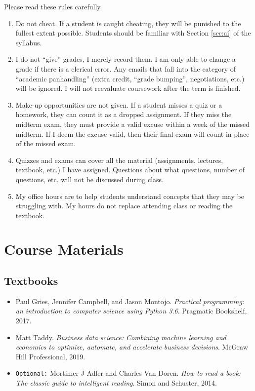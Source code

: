 \documentclass[11pt]{paper}
\begin{document}
Please read these rules carefully.

\begin{enumerate}

\item Do not cheat. If a student is caught cheating, they will be punished to the fullest extent possible. Students should be familiar with Section \ref{sec:ai} of the syllabus.

\item I do not ``give'' grades, I merely record them. I am only able to change a grade if there is a clerical error. Any emails that fall into the category of ``academic panhandling'' (extra credit, ``grade bumping'', negotiations, etc.) will be ignored. I will not reevaluate coursework after the term is finished.

\item Make-up opportunities are not given. If a student misses a quiz or a homework, they can count it as a dropped assignment. If they miss the midterm exam, they must provide a valid excuse within a week of the missed midterm. If I deem the excuse valid, then their final exam will count in-place of the missed exam. 

\item Quizzes and exams can cover all the material (assignments, lectures, textbook, etc.) I have assigned. Questions about what questions, number of questions, etc. will not be discussed during class.

\item My office hours are to help students understand concepts that they may be struggling with. My hours do not replace attending class or reading the textbook.



\end{enumerate}


\section{Course Materials}
 
\subsection{Textbooks}

\begin{itemize}
\item Paul Gries, Jennifer Campbell, and Jason Montojo. \textit{Practical programming: an introduction to computer science using Python 3.6}. Pragmatic Bookshelf, 2017.

\item Matt Taddy. \textit{Business data science: Combining machine learning and economics to optimize, automate, and accelerate business decisions}. McGraw Hill Professional, 2019.

\item \texttt{Optional:}  Mortimer J Adler and Charles Van Doren. \textit{How to read a book: The classic guide to intelligent reading}. Simon and Schuster, 2014.

\end{itemize}
\end{document}
